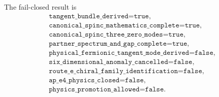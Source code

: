 \documentclass[11pt]{article}
\theoremstyle{definition}
\theoremstyle{remark}
\begin{document}
The fail-closed result is
\begin{equation}
 \boxed{\begin{gathered}
 \texttt{tangent\_bundle\_derived=true},\\
 \texttt{canonical\_spinc\_mathematics\_complete=true},\\
 \texttt{canonical\_spinc\_three\_zero\_modes=true},\\
 \texttt{partner\_spectrum\_and\_gap\_complete=true},\\
 \texttt{physical\_fermionic\_tangent\_mode\_derived=false},\\
 \texttt{six\_dimensional\_anomaly\_cancelled=false},\\
 \texttt{route\_e\_chiral\_family\_identification=false},\\
 \texttt{ap\_e4\_physics\_closed=false},\\
 \texttt{physics\_promotion\_allowed=false}.
 \end{gathered}}
 \label{eq:final-status}
\end{equation}



\end{document}
